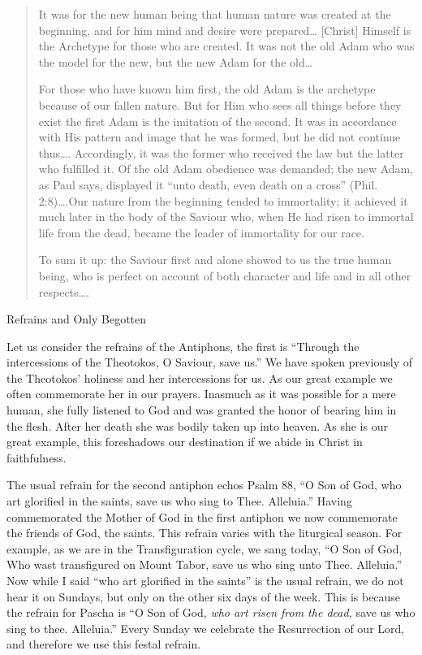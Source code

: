 \documentclass[
]{article}
\begin{document}
\begin{quote}
It was for the new human being that human nature was created at the
beginning, and for him mind and desire were prepared\ldots{}
{[}Christ{]} Himself is the Archetype for those who are created. It was
not the old Adam who was the model for the new, but the new Adam for the
old\ldots{}

For those who have known him first, the old Adam is the archetype
because of our fallen nature. But for Him who sees all things before
they exist the first Adam is the imitation of the second. It was in
accordance with His pattern and image that he was formed, but he did not
continue thus\ldots. Accordingly, it was the former who received the law
but the latter who fulfilled it. Of the old Adam obedience was demanded;
the new Adam, as Paul says, displayed it ``unto death, even death on a
cross'' (Phil. 2:8)\ldots.Our nature from the beginning tended to
immortality; it achieved it much later in the body of the Saviour who,
when He had risen to immortal life from the dead, became the leader of
immortality for our race.

To sum it up: the Saviour first and alone showed to us the true human
being, who is perfect on account of both character and life and in all
other respects\ldots.
\end{quote}

Refrains and Only Begotten

Let us consider the refrains of the Antiphons, the first is ``Through
the intercessions of the Theotokos, O Saviour, save us.'' We have spoken
previously of the Theotokos' holiness and her intercessions for us. As
our great example we often commemorate her in our prayers. Inasmuch as
it was possible for a mere human, she fully listened to God and was
granted the honor of bearing him in the flesh. After her death she was
bodily taken up into heaven. As she is our great example, this
foreshadows our destination if we abide in Christ in faithfulness.

The usual refrain for the second antiphon echos Psalm 88, ``O Son of
God, who art glorified in the saints, save us who sing to Thee.
Alleluia.'' Having commemorated the Mother of God in the first antiphon
we now commemorate the friends of God, the saints. This refrain varies
with the liturgical season. For example, as we are in the
Transfiguration cycle, we sang today, ``O Son of God, Who wast
transfigured on Mount Tabor, save us who sing unto Thee. Alleluia.'' Now
while I said ``who art glorified in the saints'' is the usual refrain,
we do not hear it on Sundays, but only on the other six days of the
week. This is because the refrain for Pascha is ``O Son of God,
\emph{who art risen from the dead,} save us who sing to thee.
Alleluia.'' Every Sunday we celebrate the Resurrection of our Lord, and
therefore we use this festal refrain.
\end{document}
